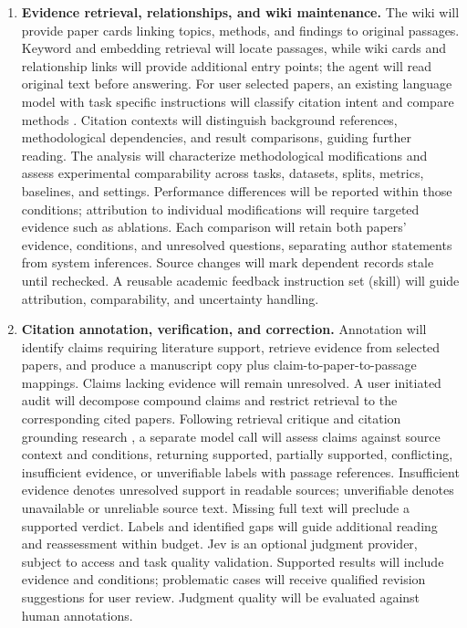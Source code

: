 \documentclass{article}
\begin{document}
\begin{enumerate}
\item \textbf{Evidence retrieval, relationships, and wiki maintenance.} The wiki will provide paper cards linking topics, methods, and findings to original passages. Keyword and embedding retrieval will locate passages, while wiki cards and relationship links will provide additional entry points; the agent will read original text before answering. For user selected papers, an existing language model with task specific instructions will classify citation intent and compare methods \cite{scicite,cito}. Citation contexts will distinguish background references, methodological dependencies, and result comparisons, guiding further reading. The analysis will characterize methodological modifications and assess experimental comparability across tasks, datasets, splits, metrics, baselines, and settings. Performance differences will be reported within those conditions; attribution to individual modifications will require targeted evidence such as ablations. Each comparison will retain both papers' evidence, conditions, and unresolved questions, separating author statements from system inferences. Source changes will mark dependent records stale until rechecked. A reusable academic feedback instruction set (skill) will guide attribution, comparability, and uncertainty handling.

\item \textbf{Citation annotation, verification, and correction.} Annotation will identify claims requiring literature support, retrieve evidence from selected papers, and produce a manuscript copy plus claim-to-paper-to-passage mappings. Claims lacking evidence will remain unresolved. A user initiated audit will decompose compound claims and restrict retrieval to the corresponding cited papers. Following retrieval critique and citation grounding research \cite{selfrag,alce}, a separate model call will assess claims against source context and conditions, returning supported, partially supported, conflicting, insufficient evidence, or unverifiable labels with passage references. Insufficient evidence denotes unresolved support in readable sources; unverifiable denotes unavailable or unreliable source text. Missing full text will preclude a supported verdict. Labels and identified gaps will guide additional reading and reassessment within budget. Jev \cite{jev} is an optional judgment provider, subject to access and task quality validation. Supported results will include evidence and conditions; problematic cases will receive qualified revision suggestions for user review. Judgment quality will be evaluated against human annotations.


\end{enumerate}
\end{document}

